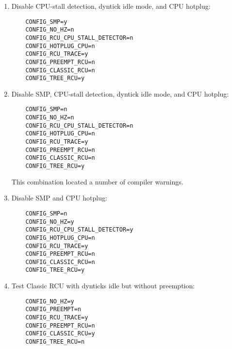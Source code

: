 \begin{enumerate}
\item	Disable CPU-stall detection, dyntick idle mode, and CPU hotplug:

\vspace{5pt}
\begin{minipage}[t]{\columnwidth}
\scriptsize
\begin{verbatim}
	CONFIG_SMP=y
	CONFIG_NO_HZ=n
	CONFIG_RCU_CPU_STALL_DETECTOR=n
	CONFIG_HOTPLUG_CPU=n
	CONFIG_RCU_TRACE=y
	CONFIG_PREEMPT_RCU=n
	CONFIG_CLASSIC_RCU=n
	CONFIG_TREE_RCU=y
\end{verbatim}
\end{minipage}
\vspace{5pt}

\item	Disable SMP, CPU-stall detection, dyntick idle mode, and CPU hotplug:

\vspace{5pt}
\begin{minipage}[t]{\columnwidth}
\scriptsize
\begin{verbatim}
	CONFIG_SMP=n
	CONFIG_NO_HZ=n
	CONFIG_RCU_CPU_STALL_DETECTOR=n
	CONFIG_HOTPLUG_CPU=n
	CONFIG_RCU_TRACE=y
	CONFIG_PREEMPT_RCU=n
	CONFIG_CLASSIC_RCU=n
	CONFIG_TREE_RCU=y
\end{verbatim}
\end{minipage}
\vspace{5pt}

	This combination located a number of compiler warnings.

\item	Disable SMP and CPU hotplug:

\vspace{5pt}
\begin{minipage}[t]{\columnwidth}
\scriptsize
\begin{verbatim}
	CONFIG_SMP=n
	CONFIG_NO_HZ=y
	CONFIG_RCU_CPU_STALL_DETECTOR=y
	CONFIG_HOTPLUG_CPU=n
	CONFIG_RCU_TRACE=y
	CONFIG_PREEMPT_RCU=n
	CONFIG_CLASSIC_RCU=n
	CONFIG_TREE_RCU=y
\end{verbatim}
\end{minipage}
\vspace{5pt}

\item	Test Classic RCU with dynticks idle but without preemption:

\vspace{5pt}
\begin{minipage}[t]{\columnwidth}
\scriptsize
\begin{verbatim}
	CONFIG_NO_HZ=y
	CONFIG_PREEMPT=n
	CONFIG_RCU_TRACE=y
	CONFIG_PREEMPT_RCU=n
	CONFIG_CLASSIC_RCU=y
	CONFIG_TREE_RCU=n
\end{verbatim}
\end{minipage}
\vspace{5pt}


\end{enumerate}
